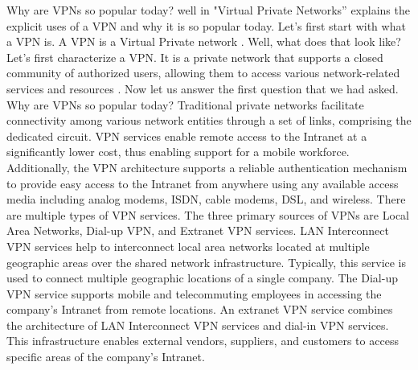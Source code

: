 Why are VPNs so popular today? well in "Virtual Private Networks'' explains the explicit uses of a VPN and why it is so popular today. Let's first start with what a VPN is. A VPN is a Virtual Private network \cite{venkateswaran2001virtual}.
Well, what does that look like? Let's first characterize a VPN. It is a private network that supports a closed community of authorized users, allowing them to access various network-related services and resources \cite{venkateswaran2001virtual}.
Now let us answer the first question that we had asked. Why are VPNs so popular today? Traditional private networks facilitate connectivity among various network entities through a set of links, comprising the dedicated circuit. VPN services enable remote access to the Intranet at a significantly lower cost, thus enabling support for a mobile workforce. Additionally, the VPN architecture supports a reliable authentication mechanism to provide easy access to the Intranet from anywhere using any available access media including analog modems, ISDN, cable modems, DSL, and wireless. There are multiple types of VPN services. The three primary sources of VPNs are Local Area Networks, Dial-up VPN, and Extranet VPN services. LAN Interconnect VPN services help to interconnect local area networks located at multiple geographic areas over the shared network infrastructure. Typically, this service is used to connect multiple geographic locations of a single company. The Dial-up VPN service supports mobile and telecommuting employees in accessing the company’s Intranet from remote locations. An extranet VPN service combines the architecture of LAN Interconnect VPN services and dial-in VPN services. This infrastructure enables external vendors, suppliers, and customers to access specific areas of the company’s Intranet.
